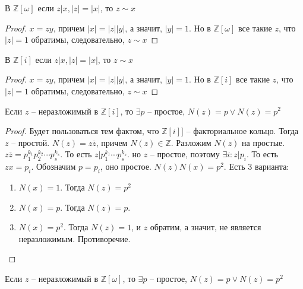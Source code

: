 \documentclass{article}
\begin{document}
\begin{statement}
    В $\mathbb{Z}[\omega]$ если $z | x, |z| = |x|$, то $z \sim x$
\end{statement}

\begin{proof}
    $x = zy$, причем $|x| = |z| |y|$, а значит, $|y| = 1$. Но в $\mathbb{Z}[\omega]$ все такие $z$, что $|z| = 1$
    обратимы, следовательно, $z \sim x$
\end{proof}

\begin{statement}
    В $\mathbb{Z}[i]$ если $z | x, |z| = |x|$, то $z \sim x$
\end{statement}

\begin{proof}
    $x = zy$, причем $|x| = |z| |y|$, а значит, $|y| = 1$. Но в $\mathbb{Z}[i]$ все такие $z$, что $|z| = 1$
    обратимы, следовательно, $z \sim x$
\end{proof}

\begin{statement}
    Если $z$ -- неразложимый в $\mathbb{Z}[i]$, то $\exists p$ -- простое, $N(z) = p \vee N(z) = p^2$
\end{statement}

\begin{proof}
    Будет пользоваться тем фактом, что $\mathbb{Z}[i]]$ -- факториальное кольцо. Тогда $z$ -- простой. $N(z) = z
    \overline z$, причем $N(z) \in \mathbb{Z}$. Разложим $N(z)$ на простые. $z \overline z = p_1^{k_1} p_2^{k_2} \cdots
    p_s^{k_s}$. То есть $z | p_1^{k_1} \cdots p_s^{k_s}$. но $z$ -- простое, поэтому $\exists i: z | p_i$. То есть $z x
    = p_i$. Обозначим $p = p_i$, оно простое. $N(z) N(x) = p^2$. Есть 3 варианта:
    \begin{enumerate}
        \item $N(x) = 1$. Тогда $N(z) = p^2$
        \item $N(x) = p$. Тогда $N(z) = p$.
        \item $N(x) = p^2$. Тогда $N(z) = 1$, и $z$ обратим, а значит, не является неразложимым. Противоречие.
    \end{enumerate}
\end{proof}

\begin{statement}
    Если $z$ -- неразложимый в $\mathbb{Z}[\omega]$, то $\exists p$ -- простое, $N(z) = p \vee N(z) = p^2$
\end{statement}
\end{document}
